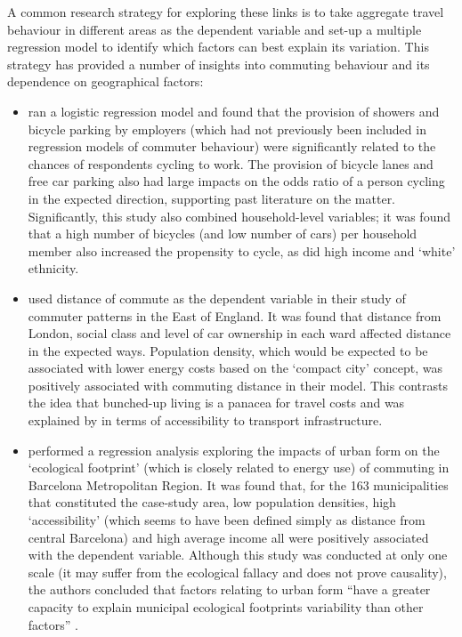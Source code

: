 A common research strategy for exploring these links is to take aggregate travel
behaviour in different areas as the dependent variable and set-up a
multiple regression model to identify which factors can best explain its variation.
This strategy has provided a number of insights into commuting
behaviour and its dependence on geographical factors:
\begin{itemize}
 \item \citet{Buehler2012} ran a logistic regression model and found that
 the provision of showers and bicycle parking by employers (which
 had not previously been included in regression models of commuter behaviour)
 were significantly related to the chances of respondents cycling to work.
 The provision of bicycle lanes and free car parking also had large
 impacts on the odds ratio of a person cycling in the expected
 direction, supporting past literature on the matter. Significantly, this
 study also combined household-level variables; it was found that a high number
 of bicycles (and low number of cars) per household member also increased the
 propensity to cycle, as did high income and `white' ethnicity.
 \item  \citet{Titheridge2006} used distance of commute as the dependent variable
 in their study of commuter patterns in the East of England. It was found that
 distance from London, social class and level of car ownership in each ward
 affected distance in the expected ways. Population density, which would
 be expected to be associated with lower energy costs based on the `compact
 city' concept, was positively associated with commuting distance in their model.
 This contrasts the idea that bunched-up living is a panacea for travel costs and
 was explained by \citet{Titheridge2006} in terms of accessibility to transport
 infrastructure.
 \item \citet{Muniz2005} performed a regression analysis exploring the impacts of urban form on
 the `ecological footprint' (which is closely related to energy use) of commuting
 in Barcelona Metropolitan Region. It was found that, for the 163 municipalities
 that constituted the case-study area, low population densities, high `accessibility'
 (which seems to have been defined simply as distance from central Barcelona)
 and high average income all were positively associated with the dependent variable.
 Although this study was conducted at only one scale (it may suffer from the
 ecological fallacy and does not prove causality), the authors concluded that
 factors relating to urban form ``have a greater capacity to explain municipal
 ecological footprints variability than other factors'' \citep[p.~511]{Muniz2005}.
\end{itemize}


